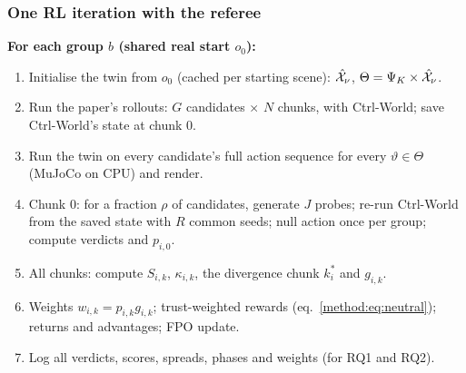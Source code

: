 \subsubsection{One RL iteration with the referee}
\begin{keybox}
\small
\textbf{For each group $b$ (shared real start $o_0$):}
\begin{enumerate}[label=\arabic*.]
\item Initialise the twin from $o_0$ (cached per starting scene): $\hat{\mathcal X}_\nu$, $\Theta=\Psi_K\times\hat{\mathcal X}_\nu$.
\item Run the paper's rollouts: $G$ candidates $\times$ $N$ chunks, with Ctrl-World; save Ctrl-World's state at chunk 0.
\item Run the twin on every candidate's full action sequence for every $\vartheta\in\Theta$ (MuJoCo on CPU) and render.
\item Chunk 0: for a fraction $\rho$ of candidates, generate $J$ probes; re-run Ctrl-World from the saved state with $R$ common seeds; null action once per group; compute verdicts and $p_{i,0}$.
\item All chunks: compute $S_{i,k}$, $\kappa_{i,k}$, the divergence chunk $k^\ast_i$ and $g_{i,k}$.
\item Weights $w_{i,k}=p_{i,k}g_{i,k}$; trust-weighted rewards (eq.~\ref{method:eq:neutral}); returns and advantages; FPO update.
\item Log all verdicts, scores, spreads, phases and weights (for RQ1 and RQ2).
\end{enumerate}
\end{keybox}

